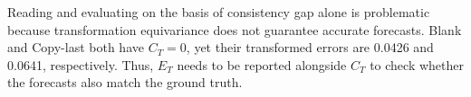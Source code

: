 Reading and evaluating on the basis of consistency gap alone is problematic because transformation equivariance does not guarantee accurate forecasts. Blank and Copy-last both have \(C_T=0\), yet their transformed errors are 0.0426 and 0.0641, respectively. Thus, \(E_T\) needs to be reported alongside \(C_T\) to check whether the forecasts also match the ground truth.
